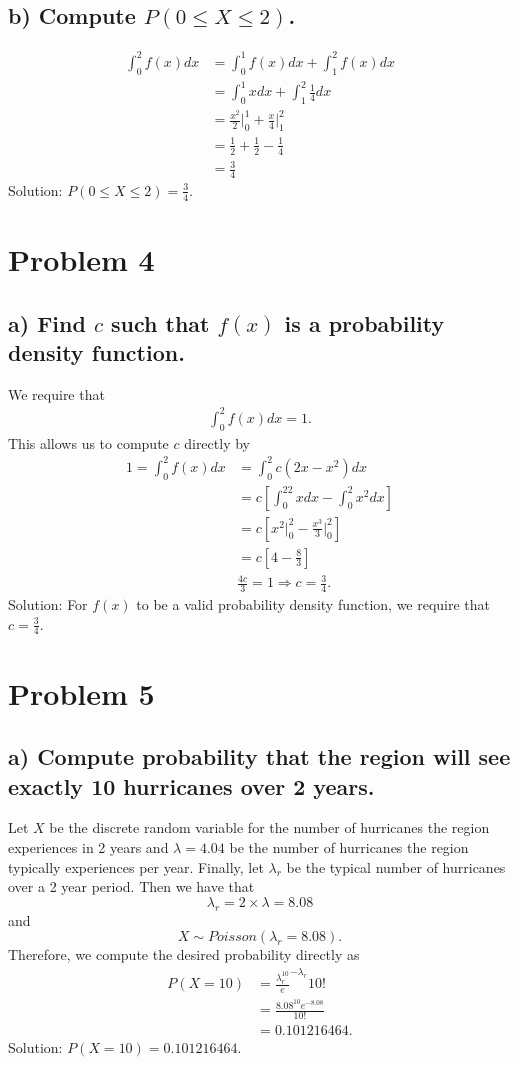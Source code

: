 \documentclass[11pt, letterpaper]{article}
\begin{document}
\subsection*{b) \normalfont Compute $P(0\leq X\leq 2)$.}
\begin{align*}
    \int_{0}^{2}f(x)dx&=\int_{0}^{1}f(x)dx+\int_{1}^2f(x)dx\\
    &=\int_0^1xdx + \int_1^2\frac{1}{4}dx\\
    &=\frac{x^2}{2}\bigg|_0^1+\frac{x}{4}\bigg|_1^2\\
    &=\frac{1}{2}+\frac{1}{2}-\frac{1}{4}\\
    &=\frac{3}{4}
\end{align*}
Solution: $P(0\leq X\leq 2)=\frac{3}{4}$.

\section*{Problem 4}
\subsection*{a) \normalfont Find $c$ such that $f(x)$ is a probability density function.}
We require that
\begin{align*}
    \int_0^2f(x)dx=1.
\end{align*}
This allows us to compute $c$ directly by
\begin{align*}
    1=\int_0^2f(x)dx&=\int_0^2c(2x-x^2)dx\\
    &=c\left[\int_0^22xdx-\int_0^2x^2dx\right]\\
    &=c\left[x^2\bigg|_0^2-\frac{x^3}{3}\bigg|_0^2\right]\\
    &=c\left[4-\frac{8}{3}\right]\\
    &\frac{4c}{3}=1\Rightarrow c=\frac{3}{4}.
\end{align*}
Solution: For $f(x)$ to be a valid probability density function, we require that $c=\frac{3}{4}$.
\section*{Problem 5}
\subsection*{a) \normalfont Compute probability that the region will see exactly 10 hurricanes over 2 years.}
Let $X$ be the discrete random variable for the number of hurricanes the region experiences in 2 years
and $\lambda=4.04$ be the number of hurricanes the region typically experiences per year. Finally, let $\lambda_r$ be the
typical number of hurricanes over a 2 year period. Then we have that
\[\lambda_r=2\times\lambda=8.08\]
and
\[X\sim Poisson(\lambda_r=8.08).\]
Therefore, we compute the desired probability directly as
\begin{align*}
    P(X=10)&=\frac{\lambda_r^10}e^{-\lambda_r}{10!}\\
    &=\frac{8.08^{10}e^{-8.08}}{10!}\\
    &=0.101216464.
\end{align*}
Solution: $P(X=10)=0.101216464$.
\end{document}
